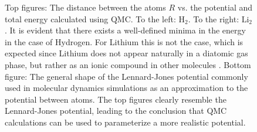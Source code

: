 \begin{figure}
 \begin{center}
  \caption{Top figures: The distance between the atoms $R$ vs. the potential and total energy calculated using QMC. To the left: $\mathrm{H_2}$. To the right: $\mathrm{Li_2}$. It is evident that there exists a well-defined minima in the energy in the case of Hydrogen. For Lithium this is not the case, which is expected since Lithium does not appear naturally in a diatomic gas phase, but rather as an ionic compound in other molecules \cite{UniversityPhysics}. Bottom figure: The general shape of the Lennard-Jones potential commonly used in molecular dynamics simulations as an approximation to the potential between atoms. The top figures clearly resemble the Lennard-Jones potential, leading to the conclusion that QMC calculations can be used to parameterize a more realistic potential.}

\end{center}
\end{figure}
